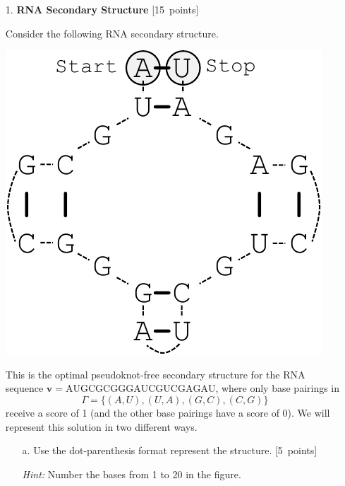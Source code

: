 \begin{enumerate}

\item[1.]  \textbf{RNA Secondary Structure} [15~points]

Consider the following RNA secondary structure. 
\begin{center}
\includegraphics[width=.45\textwidth]{RNA-crop.pdf}
\end{center}
This is the optimal pseudoknot-free secondary structure for the RNA sequence $\mathbf{v} = \mathrm{AUGCGCGGGAUCGUCGAGAU}$, where only base pairings in $$\Gamma = \{ (A,U), (U,A), (G,C), (C,G)\}$$ receive a score of 1 (and the other base pairings have a score of 0).
We will represent this solution in two different ways. %

\begin{itemize}
\item[a.] Use the dot-parenthesis format represent the structure. [5~points]

\emph{Hint: } Number the bases from 1 to 20 in the figure.
\end{itemize}

\end{enumerate}
